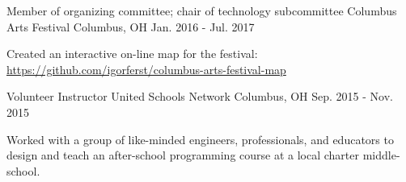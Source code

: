 

\begin{cventries}

  \cventry
    {Member of organizing committee; chair of technology subcommittee} %
    {Columbus Arts Festival} %
    {Columbus, OH} %
    {Jan. 2016 - Jul. 2017} %
    {
      \begin{cvitems} %
        \item {Created an interactive on-line map for the festival: \url{https://github.com/igorferst/columbus-arts-festival-map}}
      \end{cvitems}
    }

  \cventry
    {Volunteer Instructor} %
    {United Schools Network} %
    {Columbus, OH} %
    {Sep. 2015 - Nov. 2015} %
    {
      \begin{cvitems} %
        \item {Worked with a group of like-minded engineers, professionals, and educators to design and teach an after-school programming course at a local charter middle-school.}
      \end{cvitems}
    }

\end{cventries}
